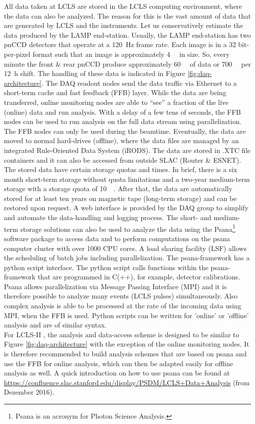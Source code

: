 All data taken at LCLS are stored in the LCLS computing environment, where the data can also be analyzed. The reason for this is the vast amount of data that are generated by LCLS and the instruments. Let us conservatively estimate the data produced by the LAMP end-station. Usually, the LAMP end-station has two pnCCD detectors that operate at a \SI{120}{\hertz} frame rate. Each image is in a 32 bit-per-pixel format such that an image is approximately \SI{4}{\mega\byte} in size. So, every minute the front \& rear pnCCD produce approximately \SI{60}{\giga\byte} of data or \SI{700}{\giga\byte} per \SI{12}{\hour} shift. The handling of these data is indicated in Figure \ref{fig:daq-architecture}. The DAQ readout nodes send the data traffic via Ethernet to a short-term cache and fast feedback (FFB) layer. While the data are being transferred, online monitoring nodes are able to ``see'' a fraction of the live (online) data and run analysis. With a delay of a few tens of seconds, the FFB nodes can be used to run analysis on the full data stream using parallelization. The FFB nodes can only be used during the beamtime. Eventually, the data are moved to normal hard-drives (offline), where the data files are managed by an integrated Rule-Oriented Data System (iRODS). The data are stored in .XTC file containers and it can also be accessed from outside SLAC (Router \& ESNET). The stored data have certain storage quotas and times. In brief, there is a six month short-term storage without quota limitations and a two-year medium-term storage with a storage quota of \SI{10}{\tera\byte}. After that, the data are automatically stored for at least ten years on magnetic tape (long-term storage) and can be restored upon request. A web interface is provided by the DAQ group to simplify and automate the data-handling and logging process. The short- and medium-term storage solutions can also be used to analyze the data using the Psana\footnote{Psana is an acronym for Photon Science Analysis.} software package \citep{Damiani-2016-JSR} to access data and to perform computations on the psana computer cluster with over 1000 CPU cores. A load sharing facility (LSF) allows the scheduling of batch jobs including parallelization. The psana-framework has a python script interface. The python script calls functions within the psana-framework that are programmed in C(++), for example, detector calibrations. Psana allows parallelization via Message Passing Interface (MPI) and it is therefore possible to analyze many events (LCLS pulses) simultaneously. Also complex analysis is able to be processed at the rate of the incoming data using MPI, when the FFB is used. Python scripts can be written for 'online' or 'offline' analysis and are of similar syntax.\\[1\baselineskip]
%
For LCLS-II \citep{Amadeo-2016-SLAC}, the analysis and data-access scheme is designed to be similar to Figure \ref{fig:daq-architecture} with the exception of the online monitoring nodes. It is therefore recommended to build analysis schemes that are based on psana and use the FFB for online analysis, which can then be adapted easily for offline analysis as well. A quick introduction on how to use psana can be found at \url{https://confluence.slac.stanford.edu/display/PSDM/LCLS+Data+Analysis} (from Dezember 2016).
%
%
%
